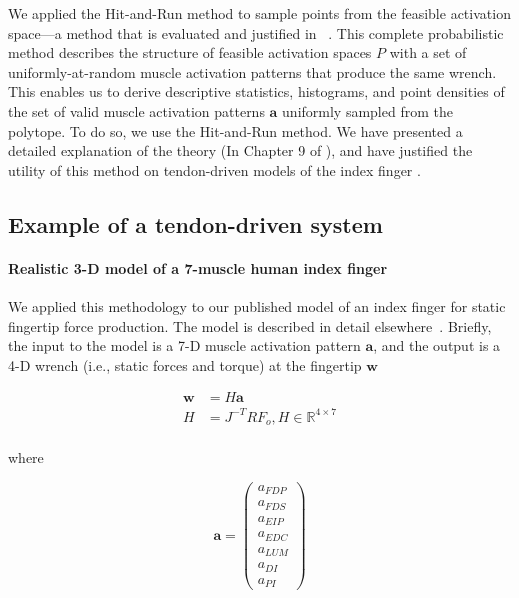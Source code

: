 \documentclass[9pt,twocolumn,twoside,lineno]{pnas-new}
\begin{document}
{We applied the Hit-and-Run method to sample points from the feasible activation space—a method that is evaluated and justified in ~\cite{valero-cuevas2015fundamentals, YYY_IEEE_STR}.
This complete probabilistic method describes the structure of feasible activation spaces $P$ with a set of uniformly-at-random muscle activation patterns that produce the same wrench. This enables us to derive descriptive statistics, histograms, and point densities of the set of valid muscle activation patterns $\textbf{a}$ uniformly sampled from the polytope. To do so, we use the Hit-and-Run method. We have presented a detailed explanation of the theory (In Chapter 9 of \cite{valero-cuevas2015fundamentals}), and have justified the utility of this method on tendon-driven models of the index finger \cite{YYY_IEEE_STR}.

\subsection*{Example of a tendon-driven system}
\paragraph*{Realistic 3-D model of a 7-muscle human index finger}
\label{ss:finger}
We applied this methodology to our published model of an index finger for static fingertip force production.
The model is described in detail elsewhere~\cite{valero-cuevas2009computational}.
Briefly, the input to the model is a 7-D muscle activation pattern $\textbf{a}$, and the output is a 4-D wrench (i.e., static forces and torque) at the fingertip $\textbf{w}$

\begin{eqnarray}
\textbf{w} &= H \textbf{a} \\
H&=J^{-T}RF_o, H \in \mathbb{R}^{4 \times 7} \\
\end{eqnarray}

where

\begin{equation}
\label{eq:a}
\textbf{a}=
\begin{pmatrix}
a_{FDP}\\
a_{FDS}\\
a_{EIP}\\
a_{EDC}\\
a_{LUM}\\
a_{DI}\\
a_{PI}
\end{pmatrix}
\end{equation}

}
\end{document}
